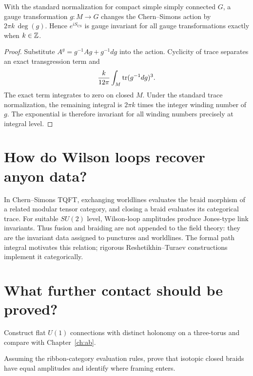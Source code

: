 \begin{theorem}
With the standard normalization for compact simple simply connected $G$, a
gauge transformation $g:M\to G$ changes the Chern--Simons action by
$2\pi k\,\deg(g)$.  Hence $e^{iS_{\mathrm{CS}}}$ is gauge invariant for all
gauge transformations exactly when $k\in\mathbb Z$.
\end{theorem}

\begin{proof}
Substitute $A^g=g^{-1}Ag+g^{-1}dg$ into the action.  Cyclicity of trace
separates an exact transgression term and
\[
\frac{k}{12\pi}\int_M\operatorname{tr}(g^{-1}dg)^3.
\]
The exact term integrates to zero on closed $M$.  Under the standard trace
normalization, the remaining integral is $2\pi k$ times the integer winding
number of $g$.  The exponential is therefore invariant for all winding
numbers precisely at integral level.
\end{proof}

\section{How do Wilson loops recover anyon data?}

In Chern--Simons TQFT, exchanging worldlines evaluates the braid morphism of a
related modular tensor category, and closing a braid evaluates its
categorical trace.  For suitable $SU(2)$ level, Wilson-loop amplitudes produce
Jones-type link invariants.  Thus fusion and braiding are not appended to the
field theory: they are the invariant data assigned to punctures and
worldlines.  The formal path integral motivates this relation; rigorous
Reshetikhin--Turaev constructions implement it categorically.
\cite{witten-jones,reshetikhin-turaev}

\section{What further contact should be proved?}

\begin{exercise}
Construct flat $U(1)$ connections with distinct holonomy on a three-torus and
compare with Chapter~\ref{ch:ab}.
\end{exercise}

\begin{exercise}
Assuming the ribbon-category evaluation rules, prove that isotopic closed
braids have equal amplitudes and identify where framing enters.
\end{exercise}


